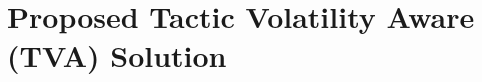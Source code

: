 \documentclass{article}
\newcommand{\dan}[1]{\textcolor{blue}{{\it [Dan says: #1]}}}
\begin{document}



















\vspace{-3mm}
\section{Proposed Tactic Volatility Aware (TVA) Solution}


\end{document}
